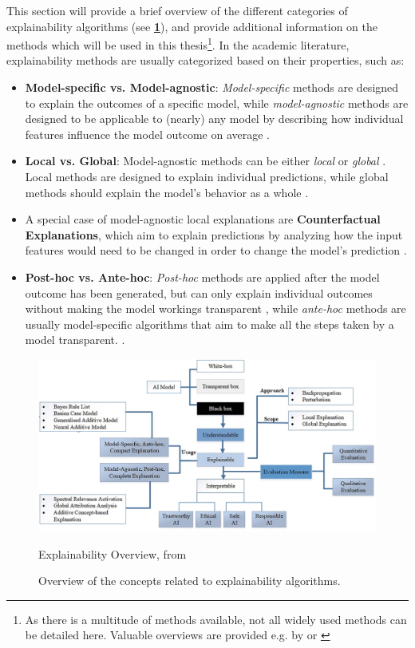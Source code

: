 This section will provide a brief overview of the different categories of explainability algorithms (see \textbf{\ref{fig:Explainability_overview}}), and provide additional information on the methods which will be used in this thesis\footnote{As there is a multitude of methods available, not all widely used methods can be detailed here. Valuable overviews are provided e.g. by \cite{SALEEM2022165} or \cite{Molnar2023}}.
In the academic literature, explainability methods are usually categorized based on their properties, such as:
\begin{itemize}
    \item \textbf{Model-specific vs. Model-agnostic}: \textit{Model-specific} methods are designed to explain the outcomes of a specific model, while \textit{model-agnostic} methods are designed to be applicable to (nearly) any model by describing how individual features influence the model outcome on average \parencite{Molnar2023}.
    \item \textbf{Local vs. Global}: Model-agnostic methods can be either \textit{local} or \textit{global} \parencite{Molnar2023}. Local methods are designed to explain individual predictions, while global methods should explain the model's behavior as a whole \parencite{SALEEM2022165}.
    \item A special case of model-agnostic local explanations are \textbf{Counterfactual Explanations}, which aim to explain predictions by analyzing how the input features would need to be changed in order to change the model's prediction \parencite{wachter2017}.
    \item \textbf{Post-hoc vs. Ante-hoc}: \textit{Post-hoc} methods are applied after the model outcome has been generated, but can only explain individual outcomes without making the model workings transparent \parencite{Lipton2018}, while \textit{ante-hoc} methods are usually model-specific algorithms that aim to make all the steps taken by a model transparent. \parencite{SALEEM2022165}.
\end{itemize}


\begin{figure}[h]
    \centering
    \includegraphics[width=1\textwidth]{images/CH02_algorithms_overview_Saleem.jpg}
    \caption{Explainability Overview, from \cite{SALEEM2022165}}
    \caption*{Overview of the concepts related to explainability algorithms.}
    \label{fig:Explainability_overview}
\end{figure}

